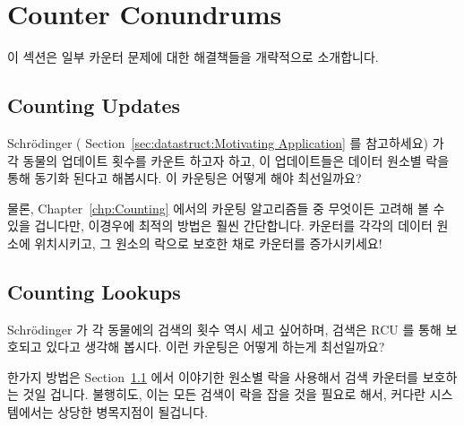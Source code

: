 
\section{Counter Conundrums}
\label{sec:together:Counter Conundrums}

이 섹션은 일부 카운터 문제에 대한 해결책들을 개략적으로 소개합니다.
\iffalse

This section outlines possible solutions to some counter conundrums.
\fi

\subsection{Counting Updates}
\label{sec:together:Counting Updates}

Schr\"odinger (
Section~\ref{sec:datastruct:Motivating Application} 를 참고하세요) 가 각 동물의
업데이트 횟수를 카운트 하고자 하고, 이 업데이트들은 데이터 원소별 락을 통해
동기화 된다고 해봅시다.
이 카운팅은 어떻게 해야 최선일까요?

물론,
Chapter~\ref{chp:Counting}
에서의 카운팅 알고리즘들 중 무엇이든 고려해 볼 수 있을 겁니다만, 이경우에
최적의 방법은 훨씬 간단합니다.
카운터를 각각의 데이터 원소에 위치시키고, 그 원소의 락으로 보호한 채로 카운터를
증가시키세요!
\iffalse

Suppose that Schr\"odinger (see
Section~\ref{sec:datastruct:Motivating Application})
wants to count the number of updates for each animal,
and that these updates are synchronized using a per-data-element lock.
How can this counting best be done?

Of course, any number of counting algorithms from
Chapter~\ref{chp:Counting}
might be considered, but the optimal approach is much simpler in this case.
Just place a counter in each data element, and increment it under the
protection of that element's lock!
\fi

\subsection{Counting Lookups}
\label{sec:together:Counting Lookups}

Schr\"odinger 가 각 동물에의 검색의 횟수 역시 세고 싶어하며, 검색은 RCU 를 통해
보호되고 있다고 생각해 봅시다.
이런 카운팅은 어떻게 하는게 최선일까요?

한가지 방법은
Section~\ref{sec:together:Counting Updates}
에서 이야기한 원소별 락을 사용해서 검색 카운터를 보호하는 것일 겁니다.
불행히도, 이는 모든 검색이 락을 잡을 것을 필요로 해서, 커다란 시스템에서는
상당한 병목지점이 될겁니다.

